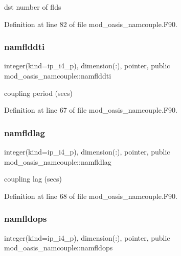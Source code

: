 dst number of flds 



Definition at line 82 of file mod\+\_\+oasis\+\_\+namcouple.\+F90.

\mbox{\label{namespacemod__oasis__namcouple_a9080617143dacb027f74c4c5158b5e58}} 
\subsubsection{\texorpdfstring{namflddti}{namflddti}}
{\footnotesize\ttfamily integer(kind=ip\+\_\+i4\+\_\+p), dimension(\+:), pointer, public mod\+\_\+oasis\+\_\+namcouple\+::namflddti}



coupling period (secs) 



Definition at line 67 of file mod\+\_\+oasis\+\_\+namcouple.\+F90.

\mbox{\label{namespacemod__oasis__namcouple_a6a4406ca14f91ef6514a18eb154e648f}} 
\subsubsection{\texorpdfstring{namfldlag}{namfldlag}}
{\footnotesize\ttfamily integer(kind=ip\+\_\+i4\+\_\+p), dimension(\+:), pointer, public mod\+\_\+oasis\+\_\+namcouple\+::namfldlag}



coupling lag (secs) 



Definition at line 68 of file mod\+\_\+oasis\+\_\+namcouple.\+F90.

\mbox{\label{namespacemod__oasis__namcouple_a4841e350d91926f5f8403e73442c76ad}} 
\subsubsection{\texorpdfstring{namfldops}{namfldops}}
{\footnotesize\ttfamily integer(kind=ip\+\_\+i4\+\_\+p), dimension(\+:), pointer, public mod\+\_\+oasis\+\_\+namcouple\+::namfldops}



